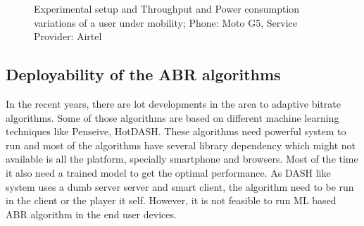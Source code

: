 \begin{figure}[t]%
	\captionsetup[subfigure]{}
	\centering
	\hspace{0.1cm}
	\hspace{0.1cm}
	\caption{Experimental setup and Throughput and Power consumption variations of a user under mobility; Phone: Moto G5, Service Provider: Airtel}\vspace*{-0.5cm}
\end{figure}

\subsection{Deployability of the ABR algorithms}
In the recent years, there are lot developments in the area to adaptive bitrate algorithms. Some of those algorithms are based on different machine learning techniques like Penseive, HotDASH. These algorithms need powerful system to run and most of the algorithms have several library dependency which might not available is all the platform, specially smartphone and browsers. Most of the time it also need a trained model to get the optimal performance. As DASH like system uses a dumb server server and smart client, the algorithm need to be run in the client or the player it self. However, it is not feasible to run ML based ABR algorithm in the end user devices. 

